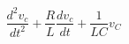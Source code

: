 \documentclass[preview]{standalone}
\begin{document}
\begin{center}
\[\frac{d^2v_c}{dt^2} + \frac{R}{L} \frac{dv_c}{dt} + \frac{1}{LC}v_C\]
\end{center}
\end{document}
